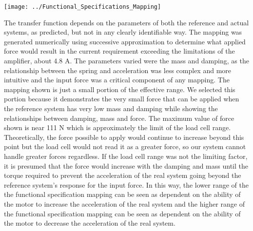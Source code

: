 \begin{figure*}[t]
	\centering
	\texttt{[image: ../Functional\_Specifications\_Mapping]}
	\caption{}
	\label{fig:Functional_Specifications_Mapping}
\end{figure*}
The transfer function depends on the parameters of both the reference and actual systems, as predicted, but not in any clearly identifiable way. The mapping was generated numerically using successive approximation to determine what applied force would result in the current requirement exceeding the limitations of the amplifier, about 4.8 A. The parameters varied were the mass and damping, as the relationship between the spring and acceleration was less complex and more intuitive and the input force was a critical component of any mapping.
The mapping shown is just a small portion of the effective range. We selected this portion because it demonstrates the very small force that can be applied when the reference system has very low mass and damping while showing the relationships between damping, mass and force. The maximum value of force shown is near 111 N which is approximately the limit of the load cell range. Theoretically, the force possible to apply would continue to increase beyond this point but the load cell would not read it as a greater force, so our system cannot handle greater forces regardless. If the load cell range was not the limiting factor, it is presumed that the force would increase with the damping and mass until the torque required to prevent the acceleration of the real system going beyond the reference system's response for the input force. In this way, the lower range of the the functional specification mapping can be seen as dependent on the ability of the motor to increase the acceleration of the real system and the higher range of the functional specification mapping can be seen as dependent on the ability of the motor to decrease the acceleration of the real system.